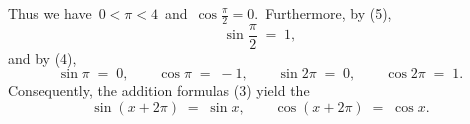 \documentclass[12pt]{article}
\theoremstyle{definition}
\begin{document}
Thus we have\, $0 < \pi < 4$\, and\, $\cos\frac{\pi}{2} = 0$.\, Furthermore, by (5),
$$\sin\frac{\pi}{2} \;=\; 1,$$
and by (4),
$$\sin\pi \;=\; 0, \qquad \cos\pi \;=\; -1, \qquad \sin2\pi \;=\; 0, \qquad \cos2\pi \;=\; 1.$$
Consequently, the addition formulas (3) yield the 
$$\sin(x\!+\!2\pi) \;=\; \sin{x}, \qquad \cos(x\!+\!2\pi) \;=\; \cos{x}.$$





\end{document}
